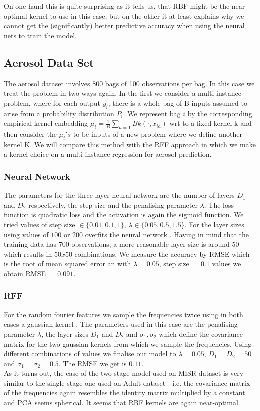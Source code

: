 \documentclass{article} %
\begin{document}
On one hand this is quite surprising as it tells us, that RBF might be the near-optimal kernel to use in this case, but on the other it at least explains why we cannot get the (significantly) better predictive accuracy when using the neural nets to train the model.


\subsection{Aerosol Data Set}
The aerosol dataset involves 800 bags of 100 observations per bag.  In this case we treat the problem in two ways again. In the first we consider a multi-instance problem, where for each output $y_{i}$, there is a whole bag of B inputs assumed to arise from a probability distribution $P_{i}$. We represent  bag $i$ by the corresponding 
empirical kernel embedding $\mu_{i} = \frac{1}{B} \sum_{a=1}{B} k( \cdot, x_{ia})$ wrt to a fixed kernel k and then consider the $\mu_{i} 's$ to be inputs of a new problem where we define another kernel K. 
We will compare this method with the RFF approach in which we make a kernel choice on a multi-instance regression for
aerosol prediction. 
\subsubsection{Neural Network}
The parameters for the three layer neural network are the number of layers $D_1$ and $D_2$ respectively, the step size and the penalising parameter $\lambda$. The loss function is quadratic loss and the activation is again the sigmoid function. We tried values of step size $\in \{  0.01, 0.1, 1\}$, $\lambda \in \{ 0.05, 0.5, 1.5 \}$. For the layer sizes using values of $100$ or $200$ overfits the neural network . Having in mind that the training data has $700$ observations, a more reasonable layer size is around $50$ which results in $50 x 50$ combinations. We measure the accuracy by RMSE which is the root of mean squared error an with $\lambda = 0.05$, step size $ = 0.1$ values we obtain RMSE $=0.091$.
\subsubsection{ RFF}
For the random fourier features we sample the frequencies twice using in both cases a gaussian kernel . The parameters used in this case are the penalising parameter $\lambda$, the layer sizes $D_1$ and $D_2$ and $\sigma_1, \sigma_2$ which define the covariance matrix for the two gaussian kernels from which we sample the frequencies. Using different combinations of values we finalise our model to $\lambda= 0.05$, $D_1=D_2=50$ and $\sigma_1=\sigma_2 = 0.5$. The RMSE we get is $0.11$.\\
As it turns out, the case of the two-stage model used on MISR dataset is very similar to the single-stage one used on Adult dataset - i.e. the covariance matrix of the frequencies again resembles the identity matrix multiplied by a constant and PCA seems spherical. It seems that RBF kernels are again near-optimal.
\end{document}
